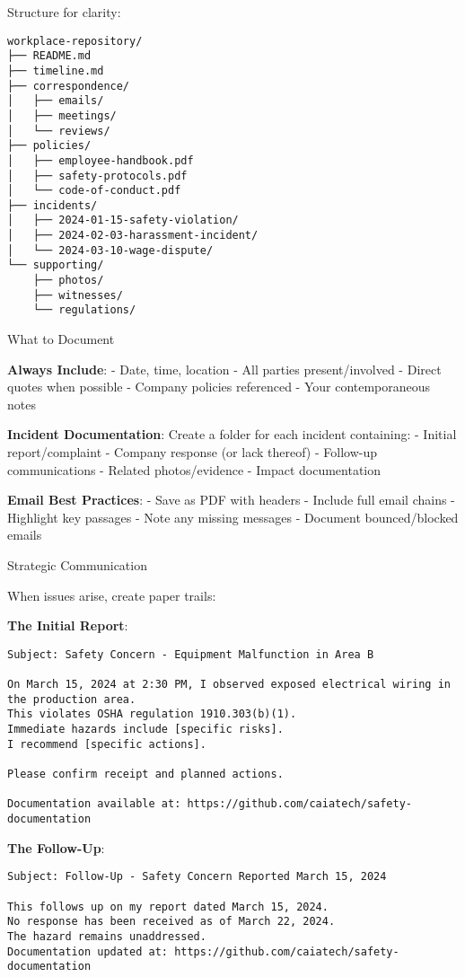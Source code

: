 Structure for clarity:

\begin{verbatim}
workplace-repository/
├── README.md
├── timeline.md
├── correspondence/
│   ├── emails/
│   ├── meetings/
│   └── reviews/
├── policies/
│   ├── employee-handbook.pdf
│   ├── safety-protocols.pdf
│   └── code-of-conduct.pdf
├── incidents/
│   ├── 2024-01-15-safety-violation/
│   ├── 2024-02-03-harassment-incident/
│   └── 2024-03-10-wage-dispute/
└── supporting/
    ├── photos/
    ├── witnesses/
    └── regulations/
\end{verbatim}

What to Document

\textbf{Always Include}: - Date, time, location - All parties
present/involved - Direct quotes when possible - Company policies
referenced - Your contemporaneous notes

\textbf{Incident Documentation}: Create a folder for each incident
containing: - Initial report/complaint - Company response (or lack
thereof) - Follow-up communications - Related photos/evidence - Impact
documentation

\textbf{Email Best Practices}: - Save as PDF with headers - Include full
email chains - Highlight key passages - Note any missing messages -
Document bounced/blocked emails

Strategic Communication

When issues arise, create paper trails:

\textbf{The Initial Report}:

\begin{verbatim}
Subject: Safety Concern - Equipment Malfunction in Area B

On March 15, 2024 at 2:30 PM, I observed exposed electrical wiring in the production area.
This violates OSHA regulation 1910.303(b)(1).
Immediate hazards include [specific risks].
I recommend [specific actions].

Please confirm receipt and planned actions.

Documentation available at: https://github.com/caiatech/safety-documentation
\end{verbatim}

\textbf{The Follow-Up}:

\begin{verbatim}
Subject: Follow-Up - Safety Concern Reported March 15, 2024

This follows up on my report dated March 15, 2024.
No response has been received as of March 22, 2024.
The hazard remains unaddressed.
Documentation updated at: https://github.com/caiatech/safety-documentation
\end{verbatim}

